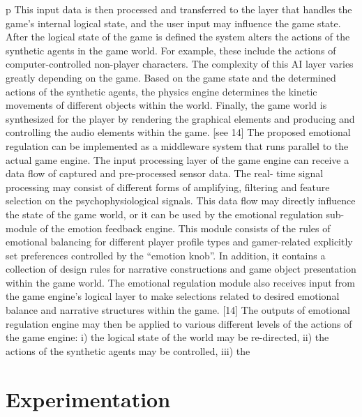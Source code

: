 \documentclass[conference]{IEEEtran}
\begin{document}
p This input data is then processed and transferred to the layer that handles the game’s internal logical state, and the user input may influence the game state. After the logical state of the game is defined the system alters the actions of the synthetic agents in the game world. For example, these include the actions of computer-controlled non-player characters. The complexity of this AI layer varies greatly depending on the game. Based on the game state and the determined actions of the synthetic agents, the physics engine determines the kinetic movements of different objects within  the world. Finally, the game world is synthesized for the player by rendering the graphical elements and producing and controlling the audio elements within the game. [see 14] The proposed emotional regulation can be implemented as a middleware system that runs parallel to the actual game engine. The input processing layer of the game engine can receive a data flow of captured and pre-processed sensor data. The real- time signal processing may consist of different forms of amplifying, filtering and feature selection on the psychophysiological signals. This data flow may directly influence the state of the game world, or it can be used by the emotional regulation sub-module of the emotion feedback engine. This module consists of the rules of emotional balancing for different player profile types and gamer-related explicitly set preferences controlled by the “emotion knob”. In addition, it contains a collection of design rules for narrative constructions and game object presentation within the game world. The emotional regulation module also receives input from the game engine’s logical layer to make selections related to desired emotional balance and narrative structures within the game. [14] The outputs of emotional regulation engine may then be applied to various different levels of the actions of the game engine: i) the logical state of the world may be re-directed, ii) the actions of the synthetic agents may be controlled, iii) the




\section{Experimentation}
\label{sec:exprm}
\end{document}
